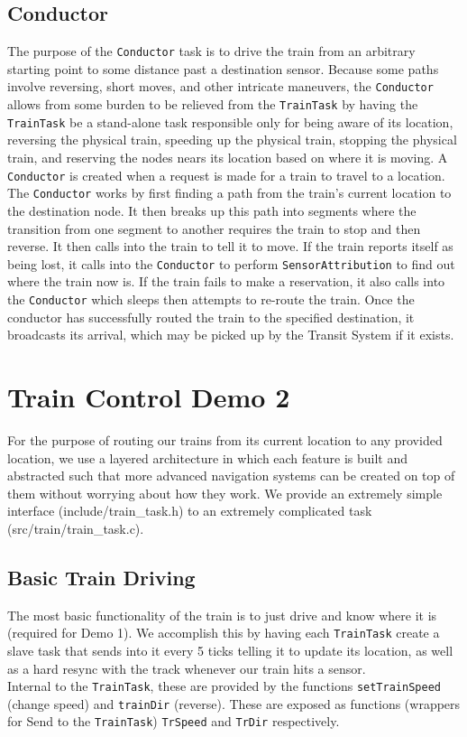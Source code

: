 \documentclass[12pt]{article}
\begin{document}
\subsection{Conductor}
The purpose of the \texttt{Conductor} task is to drive the train from an arbitrary starting point to some distance past a destination sensor.  Because some paths involve reversing, short moves, and other intricate maneuvers, the \texttt{Conductor} allows from some burden to be relieved from the \texttt{TrainTask} by having the \texttt{TrainTask} be a stand-alone task responsible only for being aware of its location, reversing the physical train, speeding up the physical train, stopping the physical train, and reserving the nodes nears its location based on where it is moving.  A \texttt{Conductor} is created when a request is made for a train to travel to a location.  The \texttt{Conductor} works by first finding a path from the train's current location to the destination node.  It then breaks up this path into segments where the transition from one segment to another requires the train to stop and then reverse.  It then calls into the train to tell it to move.  If the train reports itself as being lost, it calls into the \texttt{Conductor} to perform \texttt{SensorAttribution} to find out where the train now is.  If the train fails to make a reservation, it also calls into the \texttt{Conductor} which sleeps then attempts to re-route the train.  Once the conductor has successfully routed the train to the specified destination, it broadcasts its arrival, which may be picked up by the Transit System if it exists.
\\[2\baselineskip]
\section{Train Control Demo 2}
For the purpose of routing our trains from its current location to any provided location, we use a layered architecture
in which each feature is built and abstracted such that more advanced navigation systems can be created on top of them
without worrying about how they work. We provide an extremely simple interface (include/train\_task.h) to an extremely
complicated task (src/train/train\_task.c).
\\[1\baselineskip]
\subsection{Basic Train Driving}
The most basic functionality of the train is to just drive and know where it is (required for Demo 1). We accomplish
this by having each \texttt{TrainTask} create a slave task that sends into it every 5 ticks telling it to update its
location, as well as a hard resync with the track whenever our train hits a sensor.
\\
Internal to the \texttt{TrainTask}, these are provided by the functions \texttt{setTrainSpeed} (change speed) and
\texttt{trainDir} (reverse). These are exposed as functions (wrappers for Send to the \texttt{TrainTask})
\texttt{TrSpeed} and \texttt{TrDir} respectively.
\\[1\baselineskip]
\end{document}

